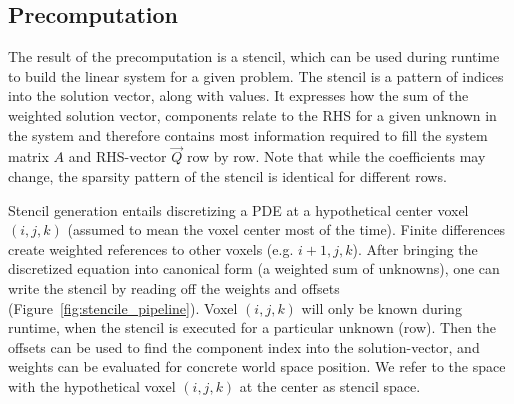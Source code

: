 \subsection{Precomputation}
\label{sec:solver_precomputation}

The result of the precomputation is a stencil, which can be used during runtime to build the linear system for a given problem. The stencil is a pattern of indices into the solution vector, along with values. It expresses how the sum of the weighted solution vector, components relate to the RHS for a given unknown in the system and therefore contains most information required to fill the system matrix $A$ and RHS-vector $\vec{Q}$ row by row. Note that while the coefficients may change, the sparsity pattern of the stencil is identical for different rows.



\vspace{0.6in}

Stencil generation entails discretizing a PDE at a hypothetical center voxel $(i, j, k)$ (assumed to mean the voxel center most of the time). Finite differences create weighted references to other voxels (e.g. $i+1, j, k$). After bringing the discretized equation into canonical form (a weighted sum of unknowns), one can write the stencil by reading off the weights and offsets (Figure~\ref{fig:stencile_pipeline}). Voxel $(i, j, k)$ will only be known during runtime, when the stencil is executed for a particular unknown (row). Then the offsets can be used to find the component index into the solution-vector, and weights can be evaluated for concrete world space position. We refer to the space with the hypothetical voxel $(i, j, k)$ at the center as stencil space.

\vspace{0.1in}

